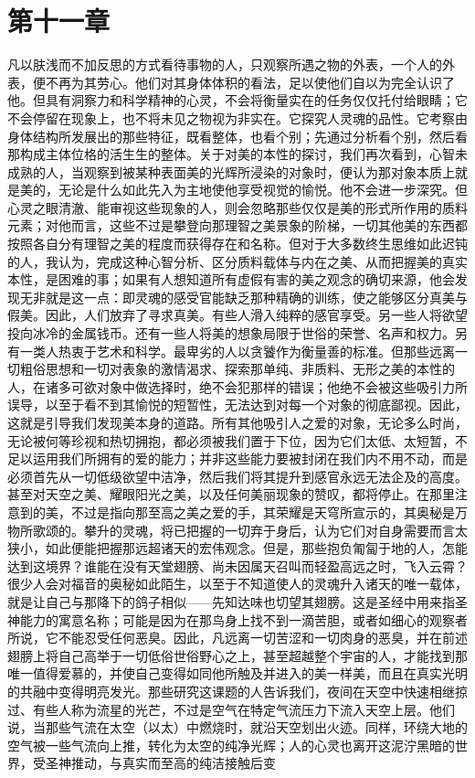 
\section{第十一章}

凡以肤浅而不加反思的方式看待事物的人，只观察所遇之物的外表，一个人的外表，便不再为其劳心。他们对其身体体积的看法，足以使他们自以为完全认识了他。但具有洞察力和科学精神的心灵，不会将衡量实在的任务仅仅托付给眼睛；它不会停留在现象上，也不将未见之物视为非实在。它探究人灵魂的品性。它考察由身体结构所发展出的那些特征，既看整体，也看个别；先通过分析看个别，然后看那构成主体位格的活生生的整体。关于对美的本性的探讨，我们再次看到，心智未成熟的人，当观察到被某种表面美的光辉所浸染的对象时，便认为那对象本质上就是美的，无论是什么如此先入为主地使他享受视觉的愉悦。他不会进一步深究。但心灵之眼清澈、能审视这些现象的人，则会忽略那些仅仅是美的形式所作用的质料元素；对他而言，这些不过是攀登向那理智之美景象的阶梯，一切其他美的东西都按照各自分有理智之美的程度而获得存在和名称。但对于大多数终生思维如此迟钝的人，我认为，完成这种心智分析、区分质料载体与内在之美、从而把握美的真实本性，是困难的事；如果有人想知道所有虚假有害的美之观念的确切来源，他会发现无非就是这一点：即灵魂的感受官能缺乏那种精确的训练，使之能够区分真美与假美。因此，人们放弃了寻求真美。有些人滑入纯粹的感官享受。另一些人将欲望投向冰冷的金属钱币。还有一些人将美的想象局限于世俗的荣誉、名声和权力。另有一类人热衷于艺术和科学。最卑劣的人以贪饕作为衡量善的标准。但那些远离一切粗俗思想和一切对表象的激情渴求、探索那单纯、非质料、无形之美的本性的人，在诸多可欲对象中做选择时，绝不会犯那样的错误；他绝不会被这些吸引力所误导，以至于看不到其愉悦的短暂性，无法达到对每一个对象的彻底鄙视。因此，这就是引导我们发现美本身的道路。所有其他吸引人之爱的对象，无论多么时尚，无论被何等珍视和热切拥抱，都必须被我们置于下位，因为它们太低、太短暂，不足以运用我们所拥有的爱的能力；并非这些能力要被封闭在我们内不用不动，而是必须首先从一切低级欲望中洁净，然后我们将其提升到感官永远无法企及的高度。甚至对天空之美、耀眼阳光之美，以及任何美丽现象的赞叹，都将停止。在那里注意到的美，不过是指向那至高之美之爱的手，其荣耀是天穹所宣示的，其奥秘是万物所歌颂的。攀升的灵魂，将已把握的一切弃于身后，认为它们对自身需要而言太狭小，如此便能把握那远超诸天的宏伟观念。但是，那些抱负匍匐于地的人，怎能达到这境界？谁能在没有天堂翅膀、尚未因属天召叫而轻盈高远之时，飞入云霄？很少人会对福音的奥秘如此陌生，以至于不知道使人的灵魂升入诸天的唯一载体，就是让自己与那降下的鸽子相似——先知达味也切望其翅膀。这是圣经中用来指圣神能力的寓意名称；可能是因为在那鸟身上找不到一滴苦胆，或者如细心的观察者所说，它不能忍受任何恶臭。因此，凡远离一切苦涩和一切肉身的恶臭，并在前述翅膀上将自己高举于一切低俗世俗野心之上，甚至超越整个宇宙的人，才能找到那唯一值得爱慕的，并使自己变得如同他所触及并进入的美一样美，而且在真实光明的共融中变得明亮发光。那些研究这课题的人告诉我们，夜间在天空中快速相继掠过、有些人称为流星的光芒，不过是空气在特定气流压力下流入天空上层。他们说，当那些气流在太空（以太）中燃烧时，就沿天空划出火迹。同样，环绕大地的空气被一些气流向上推，转化为太空的纯净光辉；人的心灵也离开这泥泞黑暗的世界，受圣神推动，与真实而至高的纯洁接触后变